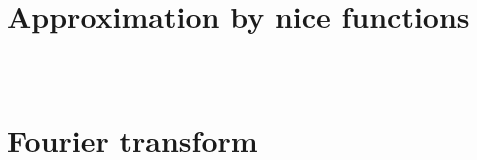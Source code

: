 \documentclass{beamer}
\numberwithin{equation}{section}
\begin{document}
\section{Approximation by nice functions}

\begin{frame}\frametitle{{\normalsize \secname} \\ {\large \subsecname}}
\end{frame}

\section{Fourier transform}

\begin{frame}\frametitle{{\normalsize \secname} \\ {\large \subsecname}}
\end{frame}
\end{document}
